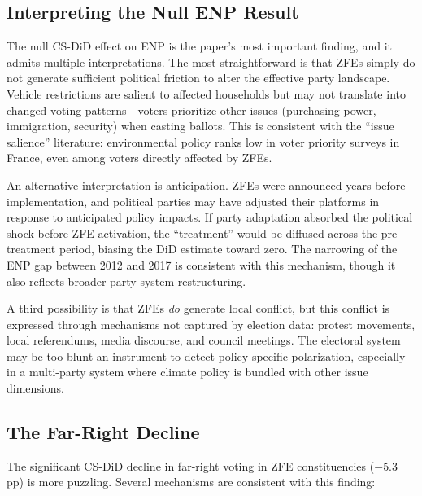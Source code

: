 \documentclass[12pt]{article}
\begin{document}
\subsection{Interpreting the Null ENP Result}

The null CS-DiD effect on ENP is the paper's most important finding, and it admits multiple interpretations. The most straightforward is that ZFEs simply do not generate sufficient political friction to alter the effective party landscape. Vehicle restrictions are salient to affected households but may not translate into changed voting patterns---voters prioritize other issues (purchasing power, immigration, security) when casting ballots. This is consistent with the ``issue salience'' literature: environmental policy ranks low in voter priority surveys in France, even among voters directly affected by ZFEs.

An alternative interpretation is anticipation. ZFEs were announced years before implementation, and political parties may have adjusted their platforms in response to anticipated policy impacts. If party adaptation absorbed the political shock before ZFE activation, the ``treatment'' would be diffused across the pre-treatment period, biasing the DiD estimate toward zero. The narrowing of the ENP gap between 2012 and 2017 is consistent with this mechanism, though it also reflects broader party-system restructuring.

A third possibility is that ZFEs \textit{do} generate local conflict, but this conflict is expressed through mechanisms not captured by election data: protest movements, local referendums, media discourse, and council meetings. The electoral system may be too blunt an instrument to detect policy-specific polarization, especially in a multi-party system where climate policy is bundled with other issue dimensions.

\subsection{The Far-Right Decline}

The significant CS-DiD decline in far-right voting in ZFE constituencies ($-5.3$ pp) is more puzzling. Several mechanisms are consistent with this finding:
\end{document}
